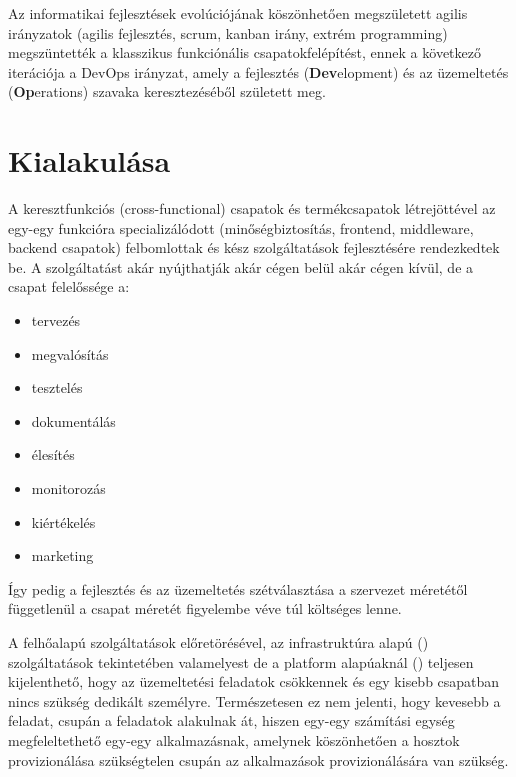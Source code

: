 
Az informatikai fejlesztések evolúciójának köszönhetően megszületett agilis irányzatok (agilis fejlesztés, scrum, kanban irány, extrém programming) megszüntették a klasszikus funkciónális csapatokfelépítést, ennek a következő iterációja a DevOps irányzat, amely a fejlesztés (\textbf{Dev}elopment) és az üzemeltetés (\textbf{Op}erations) szavaka keresztezéséből született meg.

\section{Kialakulása}

A keresztfunkciós (cross-functional) csapatok és termékcsapatok létrejöttével az egy-egy funkcióra specializálódott (minőségbiztosítás, frontend, middleware, backend csapatok) felbomlottak és kész szolgáltatások fejlesztésére rendezkedtek be. A szolgáltatást akár nyújthatják akár cégen belül akár cégen kívül, de a csapat felelőssége a:
\begin{itemize}
  \item tervezés
  \item megvalósítás
  \item tesztelés
  \item dokumentálás
  \item élesítés
  \item monitorozás
  \item kiértékelés
  \item marketing
\end{itemize}
Így pedig a fejlesztés és az üzemeltetés szétválasztása a szervezet méretétől függetlenül a csapat méretét figyelembe véve túl költséges lenne.

A felhőalapú szolgáltatások előretörésével, az infrastruktúra alapú () szolgáltatások tekintetében valamelyest de a platform alapúaknál () teljesen kijelenthető, hogy az üzemeltetési feladatok csökkennek és egy kisebb csapatban nincs szükség dedikált személyre. Természetesen ez nem jelenti, hogy kevesebb a feladat, csupán a feladatok alakulnak át, hiszen egy-egy számítási egység megfeleltethető egy-egy alkalmazásnak, amelynek köszönhetően a hosztok provizionálása szükségtelen csupán az alkalmazások provizionálására van szükség.

